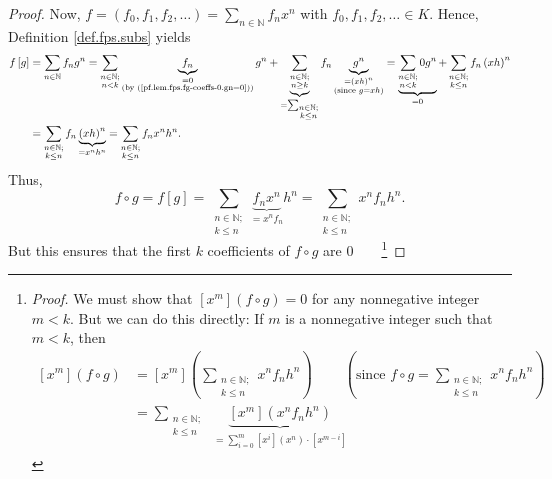 \begin{proof}
Now, $f=\left(  f_{0},f_{1},f_{2},\ldots\right)  =\sum_{n\in\mathbb{N}}%
f_{n}x^{n}$ with $f_{0},f_{1},f_{2},\ldots\in K$. Hence, Definition
\ref{def.fps.subs} yields%
\begin{align*}
f\left[  g\right]   &  =\sum_{n\in\mathbb{N}}f_{n}g^{n}=\sum_{\substack{n\in
\mathbb{N};\\n<k}}\underbrace{f_{n}}_{\substack{=0\\\text{(by
(\ref{pf.lem.fps.fg-coeffs-0.gn=0}))}}}g^{n}+\underbrace{\sum_{\substack{n\in
\mathbb{N};\\n\geq k}}}_{=\sum_{\substack{n\in\mathbb{N};\\k\leq n}}}%
f_{n}\underbrace{g^{n}}_{\substack{=\left(  xh\right)  ^{n}\\\text{(since
}g=xh\text{)}}}=\underbrace{\sum_{\substack{n\in\mathbb{N};\\n<k}}0g^{n}}%
_{=0}+\sum_{\substack{n\in\mathbb{N};\\k\leq n}}f_{n}\left(  xh\right)  ^{n}\\
&  =\sum_{\substack{n\in\mathbb{N};\\k\leq n}}f_{n}\underbrace{\left(
xh\right)  ^{n}}_{=x^{n}h^{n}}=\sum_{\substack{n\in\mathbb{N};\\k\leq n}%
}f_{n}x^{n}h^{n}.
\end{align*}
Thus,
\[
f\circ g=f\left[  g\right]  =\sum_{\substack{n\in\mathbb{N};\\k\leq
n}}\underbrace{f_{n}x^{n}}_{=x^{n}f_{n}}h^{n}=\sum_{\substack{n\in
\mathbb{N};\\k\leq n}}x^{n}f_{n}h^{n}.
\]
But this ensures that the first $k$ coefficients of $f\circ g$ are
$0$\ \ \ \ \footnote{\textit{Proof.} We must show that $\left[  x^{m}\right]
\left(  f\circ g\right)  =0$ for any nonnegative integer $m<k$. But we can do
this directly: If $m$ is a nonnegative integer such that $m<k$, then%
\begin{align*}
\left[  x^{m}\right]  \left(  f\circ g\right)   &  =\left[  x^{m}\right]
\left(  \sum_{\substack{n\in\mathbb{N};\\k\leq n}}x^{n}f_{n}h^{n}\right)
\ \ \ \ \ \ \ \ \ \ \left(  \text{since }f\circ g=\sum_{\substack{n\in
\mathbb{N};\\k\leq n}}x^{n}f_{n}h^{n}\right) \\
&  =\sum_{\substack{n\in\mathbb{N};\\k\leq n}}\underbrace{\left[
x^{m}\right]  \left(  x^{n}f_{n}h^{n}\right)  }_{\substack{=\sum_{i=0}%
^{m}\left[  x^{i}\right]  \left(  x^{n}\right)  \cdot\left[  x^{m-i}\right]
}}
\end{align*}}
\end{proof}
